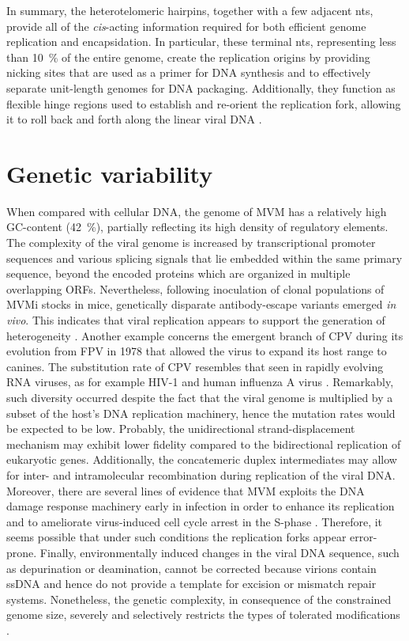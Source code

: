 In summary, the heterotelomeric hairpins, together with a few adjacent nts, provide all of the \textit{cis}-acting information required for both efficient genome replication and encapsidation. In particular, these terminal nts, representing less than 10~\% of the entire genome, create the replication origins by providing nicking sites that are used as a primer for DNA synthesis and to effectively separate unit-length genomes for DNA packaging. Additionally, they function as flexible hinge regions used to establish and re-orient the replication fork, allowing it to roll back and forth along the linear viral DNA \cite{telomere2, telomere3, handbook, RHR}.        

\section{Genetic variability}

When compared with cellular DNA, the genome of MVM has a relatively high GC-content (42~\%), partially reflecting its high density of regulatory elements. The complexity of the viral genome is increased by transcriptional promoter sequences and various splicing signals that lie embedded within the same primary sequence, beyond the encoded proteins which are organized in multiple overlapping ORFs. Nevertheless, following inoculation of clonal populations of MVMi stocks in mice, genetically disparate antibody-escape variants emerged \textit{in vivo}. This indicates that viral replication appears to support the generation of heterogeneity \cite{pmid12552010}. Another example concerns the emergent branch of CPV during its evolution from FPV in 1978 that allowed the virus to expand its host range to canines. The substitution rate of CPV resembles that seen in rapidly evolving RNA viruses, as for example HIV-1 and human influenza A virus \cite{pmid15626758}. Remarkably, such diversity occurred despite the fact that the viral genome is multiplied by a subset of the host's DNA replication machinery, hence the mutation rates would be expected to be low. Probably, the unidirectional strand-displacement mechanism may exhibit lower fidelity compared to the bidirectional replication of eukaryotic genes. Additionally, the concatemeric duplex intermediates may allow for inter- and intramolecular recombination during replication of the viral DNA. Moreover, there are several lines of evidence that MVM exploits the DNA damage response machinery early in infection in order to enhance its replication and to ameliorate virus-induced cell cycle arrest in the S-phase \cite{pmid20949077}. Therefore, it seems possible that under such conditions the replication forks appear error-prone. Finally, environmentally induced changes in the viral DNA sequence, such as depurination or deamination, cannot be corrected because virions contain ssDNA and hence do not provide a template for excision or mismatch repair systems. Nonetheless, the genetic complexity, in consequence of the constrained genome size, severely and selectively restricts the types of tolerated modifications \cite{telomere}.   

